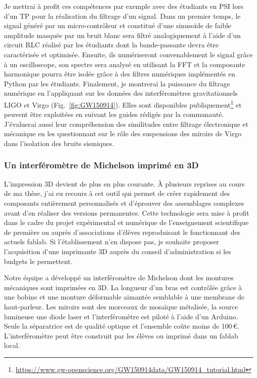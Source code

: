 \documentclass[12pt,a4paper]{article}
\begin{document}
Je mettrai à profit ces compétences par exemple avec des étudiants en PSI lors d'un TP pour la réalisation du filtrage d'un signal.
Dans un premier temps, le signal généré par un micro-contrôleur et constitué d'une sinusoïde de faible amplitude masquée par un bruit blanc sera filtré analogiquement à l'aide d'un circuit RLC réalisé par les étudiants dont la bande-passante devra être caractérisée et optimisée.
Ensuite, ils numériseront convenablement le signal grâce à un oscilloscope, son spectre sera analysé en utilisant la FFT et la composante harmonique pourra être isolée grâce à des filtres numériques implémentés en Python par les étudiants.
Finalement, je montrerai la puissance du filtrage numérique en l'appliquant sur les données des interféromètres gravitationnels LIGO et Virgo (Fig.~\ref{fig:GW150914}).
Elles sont disponibles publiquement\footnote{\url{https://www.gw-openscience.org/GW150914data/GW150914_tutorial.html}} et peuvent être exploitées en suivant les guides rédigés par la communauté.
J'évaluerai aussi leur compréhension des similitudes entre filtrage électronique et mécanique en les questionnant sur le rôle des suspensions des miroirs de Virgo dans l'isolation des bruits sismiques.

\subsubsection{Un interféromètre de Michelson imprimé en 3D}

L'impression 3D devient de plus en plus courante.
À plusieurs reprises au cours de ma thèse, j'ai eu recours à cet outil qui permet de créer rapidement des composants entièrement personnalisés et d'éprouver des assemblages complexes avant d'en réaliser des versions permanentes.
Cette technologie sera mise à profit dans le cadre du projet expérimental et numérique de l'enseignement scientifique de première ou auprès d'associations d'élèves reproduisant le fonctionnant des actuels fablab.
Si l'établissement n'en dispose pas, je souhaite proposer l'acquisition d'une imprimante 3D auprès du conseil d'administration si les budgets le permettent.

Notre équipe a développé un interféromètre de Michelson dont les montures mécaniques sont imprimées en 3D.
La longueur d'un bras est contrôlée grâce à une bobine et une monture déformable aimantée semblable à une membrane de haut-parleur.
Les miroirs sont des morceaux de mosaïque métalisée, la source lumineuse une diode laser et l'interféromètre est piloté à l'aide d'un Arduino.
Seule la séparatrice est de qualité optique et l'ensemble coûte moins de 100\,\euro.
L'interféromètre peut être construit par les élèves ou imprimé dans un fablab local.
\end{document}
